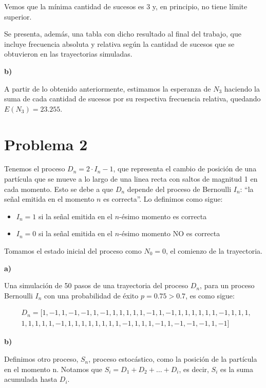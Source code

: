 \documentclass[11pt]{article}
\begin{document}
Vemos que la mínima cantidad de sucesos es 3 y, en principio, no tiene límite superior.

Se presenta, además, una tabla con dicho resultado al final del trabajo, que incluye frecuencia absoluta y relativa según la cantidad de sucesos que se obtuvieron en las trayectorias simuladas.

\textbf{b)}

A partir de lo obtenido anteriormente, estimamos la esperanza de $N_3$ haciendo la suma de cada cantidad de sucesos por su respectiva frecuencia relativa, quedando $E(N_3) = 23.255$.

\section*{Problema 2}

Tenemos el proceso $D_n = 2 \cdot I_n - 1$, que representa el cambio de posición de una partícula que se mueve a lo largo de una linea recta con saltos de magnitud 1 en cada momento. Esto se debe a que $D_n$ depende del proceso de Bernoulli $I_n$: ``la señal emitida en el momento $n$ es correcta''. Lo definimos como sigue:

\begin{itemize}
    \item $I_n = 1$ si la señal emitida en el $n$-ésimo momento es correcta
    \item $I_n = 0$ si la señal emitida en el $n$-ésimo momento NO es correcta
\end{itemize}

Tomamos el estado inicial del proceso como $N_0 = 0$, el comienzo de la trayectoria.

\textbf{a)}

Una simulación de 50 pasos de una trayectoria del proceso $D_n$, para un proceso Bernoulli $I_n$ con una probabilidad de éxito $p = 0.75 > 0.7$, es como sigue:

\begin{align*}
    &D_n = [1,-1,1,-1,-1,1,-1,1,1,1,1,1,-1,1,-1,1,1,1,1,1,1,-1,1,1,1,\\
    &1,1,1,1,1,-1,1,1,1,1,1,1,1,1,-1,1,1,1,-1,1,-1,-1,-1,1,-1]
\end{align*}

\textbf{b)}

Definimos otro proceso, $S_n$, proceso estocástico, como la posición de la partícula en el momento n. Notamos que $S_i = D_1 + D_2 + \dots + D_i$, es decir, $S_i$ es la suma acumulada hasta $D_i$.
\end{document}
